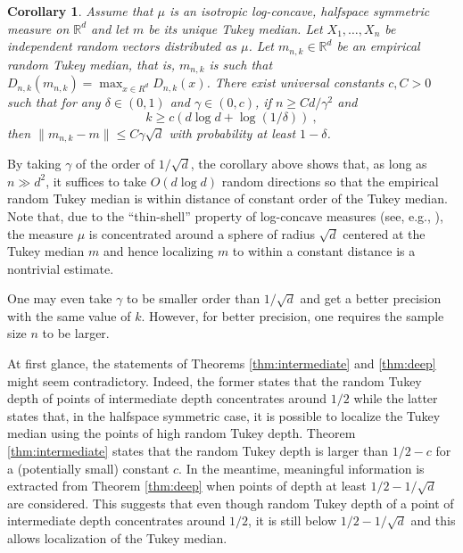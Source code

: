 \documentclass[12pt]{article}
\newcommand{\R}{\mathbb{R}}
\newtheorem{corollary}[theorem]{Corollary}
\begin{document}
\begin{tcolorbox}
\begin{corollary}
\label{cor:deep}
Assume that $\mu$ is an isotropic log-concave, halfspace symmetric measure on $\R^d$ and let $m$ be its unique Tukey median.
Let $X_1,\ldots,X_n$ be independent random vectors distributed as
$\mu$. Let $m_{n,k}\in \R^d$ be an empirical random Tukey median, that is, $m_{n,k}$
is such that $D_{n,k}(m_{n,k}) = \max_{x\in R^d} D_{n,k}(x)$.
There exist
universal constants $c,C>0$ such that for any $\delta \in (0,1)$ and
$\gamma \in (0,c)$,
if $n \ge C d/\gamma^2$ and
\[
  k \geq
  c\left(d\log d+\log(1/\delta)\right)~,
\]
then $\|m_{n,k}-m\| \le C\gamma\sqrt{d}$  with probability at least $1-\delta$.
\end{corollary}
\end{tcolorbox}

By taking $\gamma$ of the order of $1/\sqrt{d}$,
the corollary above shows that, as long as $n\gg d^2$, it suffices to take $O(d\log d)$ random
directions so that the empirical random Tukey median is within
distance of constant order of the Tukey median.
Note that, due to the ``thin-shell'' property of log-concave measures (see,
e.g., \cite{ElLe14}), the measure $\mu$ is concentrated around a
sphere of radius $\sqrt{d}$ centered at the Tukey median $m$ and hence
localizing $m$ to within a constant distance is a nontrivial
estimate.

One may even take $\gamma$ to be smaller order than $1/\sqrt{d}$
and get a better precision with the same value of $k$. However, for
better precision, one requires the sample size $n$ to be larger.

At first glance, the statements of Theorems \ref{thm:intermediate}
and \ref{thm:deep} might seem contradictory. Indeed, the former states
that the random Tukey depth of points of intermediate depth
concentrates around $1/2$ while the latter states that, in the halfspace symmetric
case, it is possible to localize the Tukey median using the points of
high random Tukey depth. Theorem \ref{thm:intermediate}
states that the random Tukey depth is larger than $1/2-c$ for a
(potentially small) constant $c$. In the meantime, meaningful
information is extracted from Theorem \ref{thm:deep} when points of
depth at least $1/2-1/\sqrt{d}$ are considered. This suggests that
even though random Tukey depth of a point of intermediate depth concentrates around $1/2$, it is still
below $1/2-1/\sqrt{d}$ and this allows localization of the Tukey median.
\end{document}

